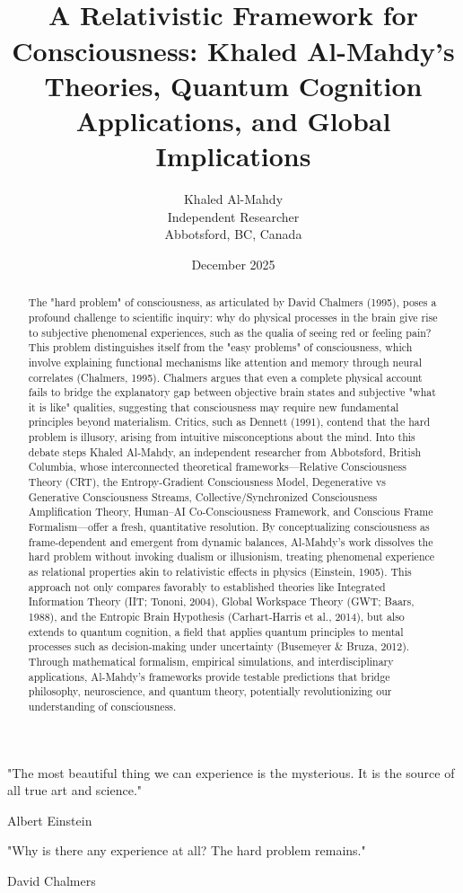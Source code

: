 \documentclass[11pt,a4paper,oneside]{article}
\title{\AlienLogo\vspace{2cm}\\ \Huge\bfseries A Relativistic Framework for Consciousness: Khaled Al-Mahdy's Theories, Quantum Cognition Applications, and Global Implications}
\author{Khaled Al-Mahdy\\ Independent Researcher\\ Abbotsford, BC, Canada}
\affil{Love my mom, Jenniffer Elliott!}
\date{December 2025}
\begin{document}
\maketitle
\thispagestyle{empty}

\newpage
\epigraph{"The most beautiful thing we can experience is the mysterious. It is the source of all true art and science."}{Albert Einstein}
\epigraph{"Why is there any experience at all? The hard problem remains."}{David Chalmers}

\newpage
\begin{abstract}
The "hard problem" of consciousness, as articulated by David Chalmers (1995), poses a profound challenge to scientific inquiry: why do physical processes in the brain give rise to subjective phenomenal experiences, such as the qualia of seeing red or feeling pain? This problem distinguishes itself from the "easy problems" of consciousness, which involve explaining functional mechanisms like attention and memory through neural correlates (Chalmers, 1995). Chalmers argues that even a complete physical account fails to bridge the explanatory gap between objective brain states and subjective "what it is like" qualities, suggesting that consciousness may require new fundamental principles beyond materialism. Critics, such as Dennett (1991), contend that the hard problem is illusory, arising from intuitive misconceptions about the mind. Into this debate steps Khaled Al-Mahdy, an independent researcher from Abbotsford, British Columbia, whose interconnected theoretical frameworks—Relative Consciousness Theory (CRT), the Entropy-Gradient Consciousness Model, Degenerative vs Generative Consciousness Streams, Collective/Synchronized Consciousness Amplification Theory, Human–AI Co-Consciousness Framework, and Conscious Frame Formalism—offer a fresh, quantitative resolution. By conceptualizing consciousness as frame-dependent and emergent from dynamic balances, Al-Mahdy's work dissolves the hard problem without invoking dualism or illusionism, treating phenomenal experience as relational properties akin to relativistic effects in physics (Einstein, 1905). This approach not only compares favorably to established theories like Integrated Information Theory (IIT; Tononi, 2004), Global Workspace Theory (GWT; Baars, 1988), and the Entropic Brain Hypothesis (Carhart-Harris et al., 2014), but also extends to quantum cognition, a field that applies quantum principles to mental processes such as decision-making under uncertainty (Busemeyer & Bruza, 2012). Through mathematical formalism, empirical simulations, and interdisciplinary applications, Al-Mahdy's frameworks provide testable predictions that bridge philosophy, neuroscience, and quantum theory, potentially revolutionizing our understanding of consciousness.
\end{abstract}
\end{document}
